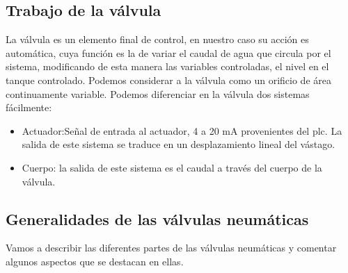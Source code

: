 \subsection{Trabajo de la válvula}
La válvula es un elemento final de control, en nuestro caso su acción es
automática, cuya función es la de variar el caudal de agua que circula por el
sistema, modificando de esta manera las variables controladas, el nivel en el
tanque controlado. Podemos considerar a la válvula como un orificio de área 
continuamente variable.
Podemos diferenciar en la válvula dos sistemas fácilmente:

   \begin{itemize}
      \item Actuador:Señal de entrada al actuador, 4 a 20 mA provenientes del 
      \gls{plc}.
      La salida de este sistema se traduce en un desplazamiento lineal del 
      vástago.
      \item Cuerpo: la salida de este sistema es el caudal a través del cuerpo
      de la válvula.
    \end{itemize}
    
\subsection{Generalidades de las válvulas neumáticas}
Vamos a describir las diferentes partes de las válvulas neumáticas y comentar 
algunos aspectos que se destacan en ellas.

